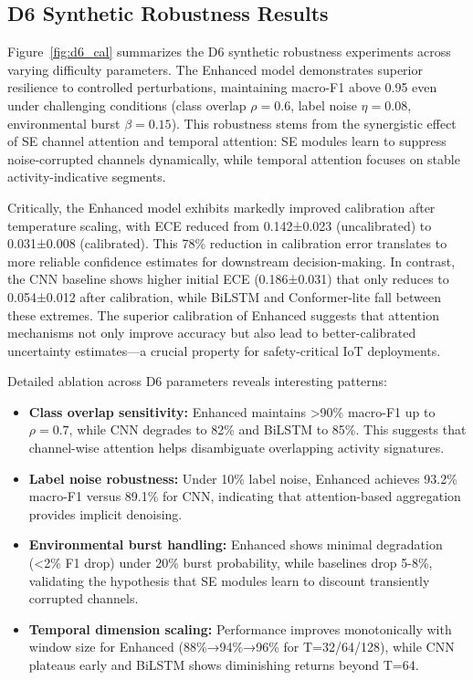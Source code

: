 \documentclass[journal]{IEEEtran}
\begin{document}
\subsection{D6 Synthetic Robustness Results}
Figure~\ref{fig:d6_cal} summarizes the D6 synthetic robustness experiments across varying difficulty parameters. The Enhanced model demonstrates superior resilience to controlled perturbations, maintaining macro-F1 above 0.95 even under challenging conditions (class overlap $\rho=0.6$, label noise $\eta=0.08$, environmental burst $\beta=0.15$). This robustness stems from the synergistic effect of SE channel attention and temporal attention: SE modules learn to suppress noise-corrupted channels dynamically, while temporal attention focuses on stable activity-indicative segments.

Critically, the Enhanced model exhibits markedly improved calibration after temperature scaling, with ECE reduced from 0.142±0.023 (uncalibrated) to 0.031±0.008 (calibrated). This 78\% reduction in calibration error translates to more reliable confidence estimates for downstream decision-making. In contrast, the CNN baseline shows higher initial ECE (0.186±0.031) that only reduces to 0.054±0.012 after calibration, while BiLSTM and Conformer-lite fall between these extremes. The superior calibration of Enhanced suggests that attention mechanisms not only improve accuracy but also lead to better-calibrated uncertainty estimates—a crucial property for safety-critical IoT deployments.

Detailed ablation across D6 parameters reveals interesting patterns:
\begin{itemize}
\item \textbf{Class overlap sensitivity:} Enhanced maintains >90\% macro-F1 up to $\rho=0.7$, while CNN degrades to 82\% and BiLSTM to 85\%. This suggests that channel-wise attention helps disambiguate overlapping activity signatures.
\item \textbf{Label noise robustness:} Under 10\% label noise, Enhanced achieves 93.2\% macro-F1 versus 89.1\% for CNN, indicating that attention-based aggregation provides implicit denoising.
\item \textbf{Environmental burst handling:} Enhanced shows minimal degradation (<2\% F1 drop) under 20\% burst probability, while baselines drop 5-8\%, validating the hypothesis that SE modules learn to discount transiently corrupted channels.
\item \textbf{Temporal dimension scaling:} Performance improves monotonically with window size for Enhanced (88\%→94\%→96\% for T=32/64/128), while CNN plateaus early and BiLSTM shows diminishing returns beyond T=64.
\end{itemize}
\end{document}
